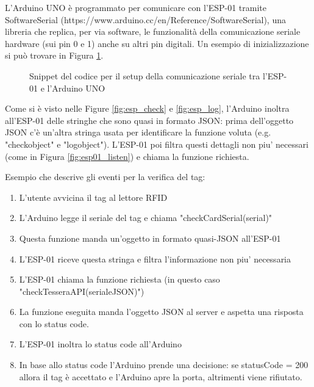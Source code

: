 \documentclass[12pt]{report}
\begin{document}
L'Arduino UNO è programmato per comunicare con l'ESP-01 tramite SoftwareSerial (https://www.arduino.cc/en/Reference/SoftwareSerial), una libreria che replica, per via software, le funzionalità della comunicazione seriale hardware (sui pin 0 e 1) anche su altri pin digitali. Un esempio di inizializzazione si può trovare in Figura \ref{fig:arduino_esp_serial_setup}.


\begin{figure}
	\caption{Snippet del codice per il setup della comunicazione seriale tra l'ESP-01 e l'Arduino UNO}
	\label{fig:arduino_esp_serial_setup}
\end{figure}

Come si è visto nelle Figure \ref{fig:esp_check} e \ref{fig:esp_log}, l'Arduino inoltra all'ESP-01 delle stringhe che sono quasi in formato JSON: prima dell'oggetto JSON c'è un'altra stringa usata per identificare la funzione voluta (e.g. "check{object}" e "log{object}"). L'ESP-01 poi filtra questi dettagli non piu' necessari (come in Figura \ref{fig:esp01_listen}) e chiama la funzione richiesta.

Esempio che descrive gli eventi per la verifica del tag:

\begin{enumerate}
	\item L'utente avvicina il tag al lettore RFID
	\item L'Arduino legge il seriale del tag e chiama "checkCardSerial(serial)"
	\item Questa funzione manda un'oggetto in formato quasi-JSON all'ESP-01
	\item L'ESP-01 riceve questa stringa e filtra l'informazione non piu' necessaria
	\item L'ESP-01 chiama la funzione richiesta (in questo caso "checkTesseraAPI(serialeJSON)")
	\item La funzione eseguita manda l'oggetto JSON al server e aspetta una risposta con lo status code.
	\item L'ESP-01 inoltra lo status code all'Arduino
	\item In base allo status code l'Arduino prende una decisione: se statusCode = 200 allora il tag è accettato e l'Arduino apre la porta, altrimenti viene rifiutato.
\end{enumerate}
\end{document}
